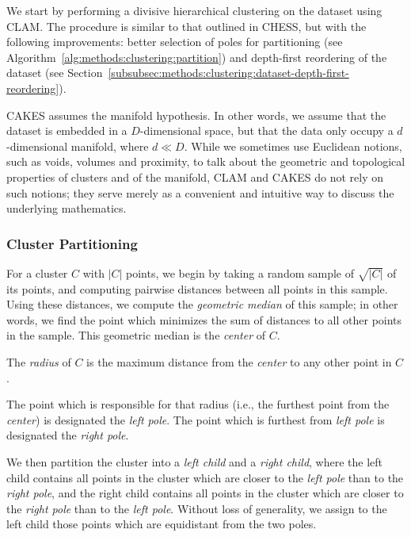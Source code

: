 We start by performing a divisive hierarchical clustering on the dataset using CLAM.
The procedure is similar to that outlined in CHESS, but with the following improvements:
better selection of poles for partitioning (see Algorithm~\ref{alg:methods:clustering:partition}) and depth-first reordering of the dataset (see Section~\ref{subsubsec:methods:clustering:dataset-depth-first-reordering}). 

CAKES assumes the manifold hypothesis. 
In other words, we assume that the dataset is embedded in a $D$-dimensional space, but that the data only occupy a $d$-dimensional manifold, where $d \ll D$. 
While we sometimes use Euclidean notions, such as voids, volumes and proximity, to talk about the geometric and topological properties of clusters and of the manifold, CLAM and CAKES do not rely on such notions; 
they serve merely as a convenient and intuitive way to discuss the underlying mathematics.


\subsubsection {Cluster Partitioning}
\label{subsubsec:methods:cluster-partitioning}

For a cluster $C$ with $|C|$ points, we begin by taking a random sample of $\sqrt{|C|}$ of its points, and computing pairwise distances between all points in this sample.
Using these distances, we compute the \emph{geometric median} of this sample; in other words, we find the point which minimizes the sum of distances to all other points in the sample.
This geometric median is the \emph{center} of $C$.

The \emph{radius} of $C$ is the maximum distance from the \emph{center} to any other point in $C$.

The point which is responsible for that radius (i.e., the furthest point from the \emph{center}) is designated the \emph{left pole}.
The point which is furthest from \emph{left pole} is designated the \emph{right pole}.

We then partition the cluster into a \emph{left child} and a \emph{right child}, where the left child contains all points in the cluster which are closer to the \emph{left pole} than to the \emph{right pole}, and the right child contains all points in the cluster which are closer to the \emph{right pole} than to the \emph{left pole}.
Without loss of generality, we assign to the left child those points which are equidistant from the two poles.

